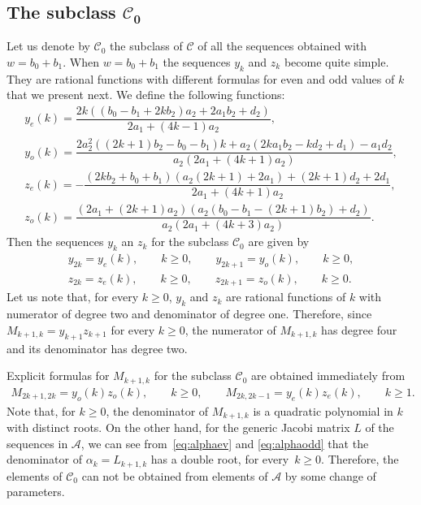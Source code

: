 \documentclass[pdftex]{sigma}
\def\cA{\mathcal A}
\def\cC{\mathcal C}
\numberwithin{equation}{section}
\begin{document}
\subsection[The subclass C\_0]{The subclass $\boldsymbol{\cC_0}$}
Let us denote by $\cC_0$ the subclass of $\cC$ of all the sequences obtained with $w=b_0+b_1$.
When $w=b_0+b_1$ the sequences $y_k$ and $z_k$ become quite simple. They are rational functions with different formulas for even and odd values of $k$ that we present next.
 We define the following functions:
 \begin{gather*}%
	 y_e(k)=\dfrac{2 k ( ( b_0-b_1+ 2 k b_2) a_2 + 2 a_1 b_2 + d_2)}{2 a_1 + (4 k -1) a_2},
\\ %
	y_o(k)=\dfrac{2 a_2^2 ( (2 k+1) b_2 -b_0 -b_1) k +a_2 (2 k a_1 b_2 -k d_2 + d_1) - a_1 d_2 }{ a_2 (2 a_1+ (4k+1) a_2) },
\\ %
	z_e(k)=- \dfrac{(2 k b_2 +b_0+b_1)(a_2 ( 2 k+1) + 2 a_1) + ( 2 k+1) d_2 + 2 d_1}{2 a_1 + ( 4 k+1) a_2},
\\ %
	z_o(k)=\dfrac{ (2 a_1+(2k+1) a_2)( a_2 ( b_0-b_1 - ( 2k+1)b_2) + d_2)}{a_2 ( 2 a_1+ ( 4k +3) a_2)}.
\end{gather*}
Then the sequences $y_k$ an $z_k$ for the subclass $\cC_0$ are given by
\begin{gather*}%
 y_{2k}= y_e(k), \qquad  k\ge 0,\qquad
 y_{2k+1}=y_o(k),\qquad  k\ge 0,  \\
 z_{2k}=z_e(k),\qquad  k\ge 0,\qquad
 z_{2 k+1}=z_o(k), \qquad  k \ge 0.
\end{gather*}
Let us note that, for every $k \ge 0$, $y_k$ and $z_k$ are rational functions of $k$ with numerator of degree two and denominator of degree one.
Therefore, since $M_{k+1,k}= y_{k+1} z_{k+1}$ for every $k\ge 0$, the numerator of $M_{k+1,k}$ has degree four and its denominator has degree two.

Explicit formulas for $M_{k+1,k}$ for the subclass $\cC_0$ are obtained immediately from
\begin{gather*}%
 M_{2k+1,2k}= y_o(k) z_o(k),\qquad  k\ge 0,\qquad
 M_{2k, 2k-1}= y_e(k) z_e(k), \qquad  k\ge 1.
\end{gather*}
Note that, for $k\ge 0$, the denominator of $M_{k+1,k}$ is a quadratic polynomial in $k$ with distinct roots. On the other hand, for the generic Jacobi matrix $L$ of the sequences in $\cA$, we can see from~\eqref{eq:alphaev} and \eqref{eq:alphaodd} that the denominator of $\alpha_k=L_{k+1,k}$ has a double root, for every~${k\ge 0}$. Therefore, the elements of $\cC_0$ can not be obtained from elements of $\cA$ by some change of parameters.
\end{document}
